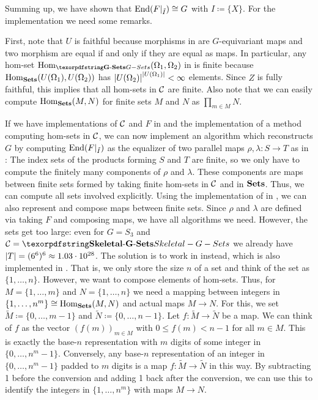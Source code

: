 \begin{rem}[Implementation]\label{rem:EndAsEqualizer}
Summing up, we have shown that $\operatorname{End}(F\vert_{\tilde I}) \cong G$ with $I \coloneqq \{X\}$. For the implementation we need some remarks.

First, note that $U$ is faithful because morphisms in \Gset{} are $G$-equivariant maps and two morphism are equal if and only if they are equal as maps. In particular, any hom-set $\Hom_\Gset(\Omega_1,\Omega_2)$ in \Gset{} is finite because $\operatorname{Hom}_{{\operatorname{\mathbf{Sets}}}}(U(\Omega_1),U(\Omega_2))$ has ${\lvert U(\Omega_2)\rvert}^{{\lvert U(\Omega_1)\rvert}} < \infty$ elements. Since $Z$ is fully faithful, this implies that all hom-sets in $\mathcal{C}$ are finite. Also note that we can easily compute $\operatorname{Hom}_{{\operatorname{\mathbf{Sets}}}}(M,N)$ for finite sets $M$ and $N$ as $\prod_{m \in M} N$.

If we have implementations of $\mathcal{C}$ and $F$ in \CapPkg{} and the implementation of a method computing hom-sets in $\mathcal{C}$, we can now implement an algorithm which reconstructs $G$ by computing $\operatorname{End}(F\vert_{\tilde I})$ as the equalizer of two parallel maps $\rho,\lambda\colon S \to T$ as in : The index sets of the products forming $S$ and $T$ are finite, so we only have to compute the finitely many components of $\rho$ and $\lambda$. These components are maps between finite sets formed by taking finite hom-sets in $\mathcal{C}$ and in ${{\operatorname{\mathbf{Sets}}}}$. Thus, we can compute all sets involved explicitly. Using the implementation of \FinSets{} in \cite{FinSetsForCAP}, we can also represent and compose maps between finite sets. Since $\rho$ and $\lambda$ are defined via taking $F$ and composing maps, we have all algorithms we need. However, the sets get too large: even for $G = S_3$ and $\Ccal = \SkeletalGSets$ we already have ${\lvert T\rvert} = (6^6)^6 \approx 1.03 \cdot 10^{28}$. The solution is to work in \SkeletalFinSets{} instead, which is also implemented in \cite{FinSetsForCAP}. That is, we only store the size $n$ of a set and think of the set as $\{1,\dots,n\}$. However, we want to compose elements of hom-sets. Thus, for $M = \{1,\dots,m\}$ and $N = \{1,\dots,n\}$ we need a mapping between integers in $\{1,\dots,n^m\} \cong \operatorname{Hom}_{{\operatorname{\mathbf{Sets}}}}(M,N)$ and actual maps $M \to N$. For this, we set $\tilde M \coloneqq \{0,\dots,m-1\}$ and $\tilde N \coloneqq \{0,\dots,n-1\}$. Let $f\colon \tilde M \to \tilde N$ be a map. We can think of $f$ as the vector $(f(m))_{m \in M}$ with $0 \leq f(m) < n-1$ for all $m \in M$. This is exactly the base-$n$ representation with $m$ digits of some integer in $\{0,\dots,n^m - 1\}$. Conversely, any base-$n$ representation of an integer in $\{0,\dots,n^m - 1\}$ padded to $m$ digits is a map $f\colon \tilde M \to \tilde N$ in this way. By subtracting 1 before the conversion and adding 1 back after the conversion, we can use this to identify the integers in $\{1,\dots,n^m\}$ with maps $M \to N$.


\end{rem}
